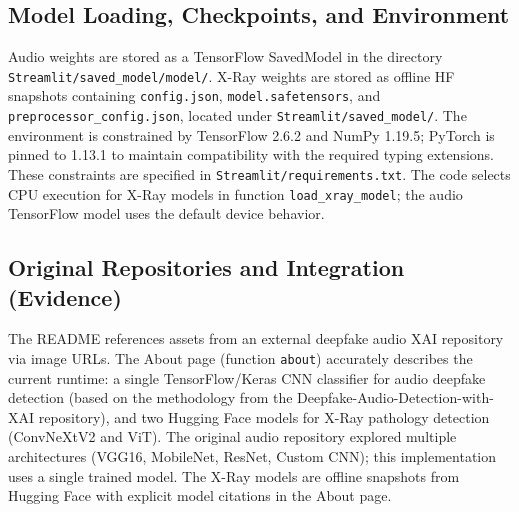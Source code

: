 \documentclass[11pt,a4paper]{article}
\begin{document}
\subsection{Model Loading, Checkpoints, and Environment}
Audio weights are stored as a TensorFlow SavedModel in the directory \texttt{Streamlit/saved\_model/model/}. X-Ray weights are stored as offline HF snapshots containing \texttt{config.json}, \texttt{model.safetensors}, and \texttt{preprocessor\_config.json}, located under \texttt{Streamlit/saved\_model/}. The environment is constrained by TensorFlow 2.6.2 and NumPy 1.19.5; PyTorch is pinned to 1.13.1 to maintain compatibility with the required typing extensions. These constraints are specified in \texttt{Streamlit/requirements.txt}. The code selects CPU execution for X-Ray models in function \texttt{load\_xray\_model}; the audio TensorFlow model uses the default device behavior.

\subsection{Original Repositories and Integration (Evidence)}
The README references assets from an external deepfake audio XAI repository via image URLs. The About page (function \texttt{about}) accurately describes the current runtime: a single TensorFlow/Keras CNN classifier for audio deepfake detection (based on the methodology from the Deepfake-Audio-Detection-with-XAI repository), and two Hugging Face models for X-Ray pathology detection (ConvNeXtV2 and ViT). The original audio repository explored multiple architectures (VGG16, MobileNet, ResNet, Custom CNN); this implementation uses a single trained model. The X-Ray models are offline snapshots from Hugging Face with explicit model citations in the About page.
\end{document}

